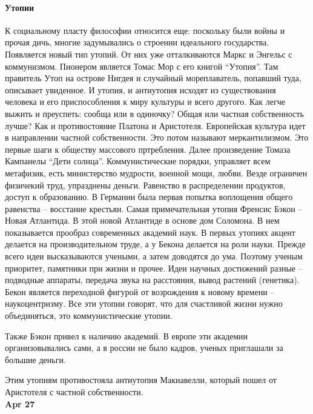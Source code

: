 \documentclass[a4paper, 12pt]{article}
\begin{document}
\paragraph{Утопии}
К социальному пласту философии относится еще: поскольку были войны и прочая дичь, многие задумывались о строении идеального государства. Появляется новый тип утопий. От них уже отталкиваются Маркс и Энгельс с коммунизмом. Пионером является Томас Мор с его книгой ``Утопия''. Там правитель Утоп на острове Нигдея и случайный мореплаватель, попавший туда, описывает увиденное. И утопия, и антиутопия исходят из существования человека и его приспособления к миру культуры и всего другого. Как легче выжить и преуспеть: сообща или в одиночку? Общая или частная собственность лучше? Как и противостояние Платона и Аристотеля. Европейская культура идет в направлении частной собственности. Это потом называют меркантилизмом. Это первые шаги к обществу массового пртребления. Далее произведение Томаза Кампанелы ``Дети солнца''. Коммунистические порядки, управляет всем метафизик, есть министерство мудрости, военной мощи, любви. Везде ограничен физичекий труд, упразднены деньги. Равенство в распределении продуктов, доступ к образованию. В Германии была первая попытка воплощения общего равенства -- восстание крестьян. Самая примечательная утопия Френсис Бэкон -- Новая Атлантида. В этой новой Атлантиде в основе дом Соломона. В нем показывается прообраз современных академий наук. В первых утопиях акцент делается на производительном труде, а у Бекона делается на роли науки. Прежде всего идеи высказываются учеными, а затем доводятся до ума. Поэтому ученым приоритет, памятники при жизни и прочее. Идеи научных достижений разные -- подводные аппараты, передача звука на расстояния, вывод растений (генетика). Бекон является переходной фигурой от возрождения к новому времени -- наукоцентризму. Все эти утопии говорят, что для счастливой жизни нужно объединяться, это коммунистические утопии. 

Также Бэкон привел к наличию академий. В европе эти академии организовывались сами, а в россии не было кадров, ученых приглашали за большие деньги. 

Этим утопиям противостояла антиутопия Макиавелли, который пошел от Аристотеля с частной собственности. 
\\

\hfill \textbf{Apr 27}
\end{document}
